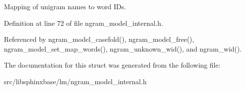 Mapping of unigram names to word I\+Ds. 



Definition at line 72 of file ngram\+\_\+model\+\_\+internal.\+h.



Referenced by ngram\+\_\+model\+\_\+casefold(), ngram\+\_\+model\+\_\+free(), ngram\+\_\+model\+\_\+set\+\_\+map\+\_\+words(), ngram\+\_\+unknown\+\_\+wid(), and ngram\+\_\+wid().



The documentation for this struct was generated from the following file\+:\begin{DoxyCompactItemize}
\item 
src/libsphinxbase/lm/ngram\+\_\+model\+\_\+internal.\+h\end{DoxyCompactItemize}
